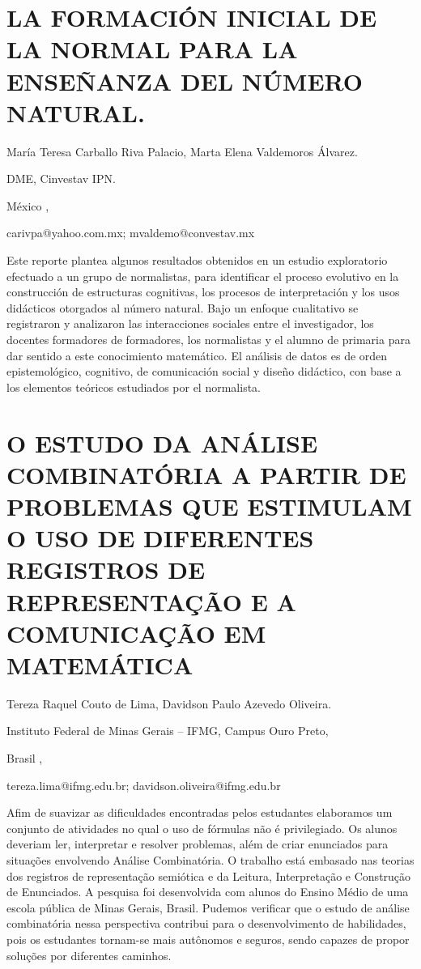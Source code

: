 \section{LA FORMACIÓN INICIAL DE LA NORMAL PARA LA ENSEÑANZA DEL NÚMERO NATURAL.}

\begin{datos}

María Teresa Carballo Riva Palacio, Marta Elena Valdemoros Álvarez.

DME, Cinvestav IPN. 

México ,

carivpa@yahoo.com.mx; mvaldemo@convestav.mx

\end{datos}

Este reporte plantea algunos resultados obtenidos en un estudio exploratorio
efectuado a un grupo de normalistas, para identificar el proceso evolutivo
en la construcción de estructuras cognitivas, los procesos de interpretación
y los usos didácticos otorgados al número natural. Bajo un enfoque
cualitativo se registraron y analizaron las interacciones sociales
entre el investigador, los docentes formadores de formadores, los
normalistas y el alumno de primaria para dar sentido a este conocimiento
matemático. El análisis de datos es de orden epistemológico, cognitivo,
de comunicación social y diseño didáctico, con base a los elementos
teóricos estudiados por el normalista. 


\section{O ESTUDO DA ANÁLISE COMBINATÓRIA A PARTIR DE PROBLEMAS QUE ESTIMULAM
O USO DE DIFERENTES REGISTROS DE REPRESENTAÇÃO E A COMUNICAÇÃO EM
MATEMÁTICA}

\begin{datos}

Tereza Raquel Couto de Lima, Davidson Paulo Azevedo Oliveira.

Instituto Federal de Minas Gerais – IFMG, Campus Ouro Preto,

Brasil ,

tereza.lima@ifmg.edu.br; davidson.oliveira@ifmg.edu.br

\end{datos}

Afim de suavizar as dificuldades encontradas pelos estudantes elaboramos
um conjunto de atividades no qual o uso de fórmulas não é privilegiado.
Os alunos deveriam ler, interpretar e resolver problemas, além de
criar enunciados para situações envolvendo Análise Combinatória. O
trabalho está embasado nas teorias dos registros de representação
semiótica e da Leitura, Interpretação e Construção de Enunciados.
A pesquisa foi desenvolvida com alunos do Ensino Médio de uma escola
pública de Minas Gerais, Brasil. Pudemos verificar que o estudo de
análise combinatória nessa perspectiva contribui para o desenvolvimento
de habilidades, pois os estudantes tornam-se mais autônomos e seguros,
sendo capazes de propor soluções por diferentes caminhos. 


